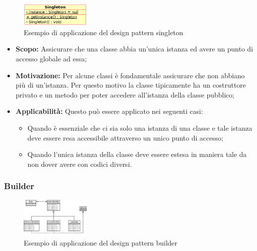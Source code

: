 \documentclass{scalatekids-article}
\begin{document}
\begin{figure}[H]
  \begin{center}
    \includegraphics[width=0.3\textwidth, keepaspectratio]{img/designPattern/Singleton.png}
    \caption{Esempio di applicazione del design pattern singleton}
  \end{center}
\end{figure}

\begin{itemize}

\item \textbf{Scopo:} Assicurare che una classe abbia un'unica istanza ed avere
  un punto di accesso globale ad essa;

\item \textbf{Motivazione:} Per alcune classi è fondamentale assicurare che non
  abbiano più di un'istanza. Per questo motivo la classe tipicamente ha un
  costruttore privato e un metodo per poter accedere all'istanza della classe
  pubblico;

\item \textbf{Applicabilità:} Questo  può essere
  applicato nei seguenti casi:
  \begin{itemize}
  \item Quando è essenziale che ci sia solo una istanza di una classe e tale
    istanza deve essere resa accessibile attraverso un unico punto di accesso;
  \item Quando l'unica istanza della classe deve essere estesa in maniera
    tale da non dover avere  con codici diversi.
  \end{itemize}

\end{itemize}

\subsubsection{Builder}

\begin{figure}[H]
  \begin{center}
    \includegraphics[width=0.3\textwidth, keepaspectratio]{img/designPattern/Builder.png}
    \caption{Esempio di applicazione del design pattern builder}
  \end{center}
\end{figure}
\end{document}
